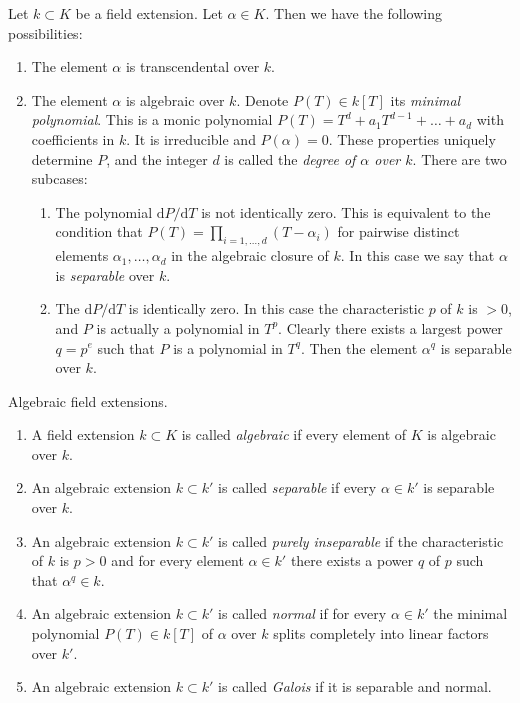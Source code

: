 \medskip\noindent
Let $k \subset K$ be a field extension. Let $\alpha \in K$. Then we have the
following possibilities:
\begin{enumerate}
\item The element $\alpha$ is transcendental over $k$.
\item The element $\alpha$ is algebraic over $k$. Denote
$P(T) \in k[T]$ its {\it minimal polynomial}. This is a monic polynomial
$P(T) = T^d + a_1 T^{d - 1} + \ldots + a_d$ with coefficients in
$k$. It is irreducible and $P(\alpha) = 0$. These properties
uniquely determine $P$, and the integer $d$ is called the
{\it degree of $\alpha$ over $k$}. There are two subcases:
\begin{enumerate}
\item The polynomial $\text{d}P/\text{d}T$ is not identically zero.
This is equivalent to the condition that
$P(T) = \prod_{i = 1, \ldots, d} (T - \alpha_i)$ for
pairwise distinct elements $\alpha_1, \ldots, \alpha_d$
in the algebraic closure of $k$.
In this case we say that $\alpha$ is {\it separable} over $k$.
\item The $\text{d}P/\text{d}T$ is identically zero. In this case the
characteristic $p$ of $k$ is $ > 0$, and $P$ is actually a polynomial
in $T^p$. Clearly there exists a largest power $q = p^e$ such that $P$ is
a polynomial in $T^q$. Then the element $\alpha^q$ is separable over $k$.
\end{enumerate}
\end{enumerate}

\begin{definition}
\label{definition-separable-algebraic}
Algebraic field extensions.
\begin{enumerate}
\item A field extension $k \subset K$ is called {\it algebraic}
if every element of $K$ is algebraic over $k$.
\item An algebraic extension $k \subset k'$ is called {\it separable}
if every $\alpha \in k'$ is separable over $k$.
\item An algebraic
extension $k \subset k'$ is called {\it purely inseparable} if
the characteristic of $k$ is $p > 0$ and for every element
$\alpha \in k'$ there exists a power $q$ of $p$ such that
$\alpha^q \in k$.
\item An algebraic extension $k \subset k'$ is called {\it normal}
if for every $\alpha \in k'$ the minimal polynomial $P(T) \in k[T]$
of $\alpha$ over $k$ splits completely into linear factors over $k'$.
\item An algebraic extension $k \subset k'$ is called {\it Galois}
if it is separable and normal.
\end{enumerate}
\end{definition}

